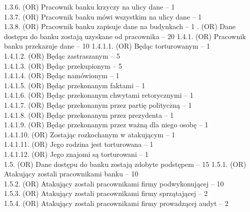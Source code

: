 \documentclass[10pt,a4paper,twoside]{article}
\newenvironment{subs}
{\adjustwidth{3em}{0pt}}
{\endadjustwidth}
\begin{document}
\begin{subs}
\begin{subs}
            1.3.6. (OR) Pracownik banku krzyczy na ulicy dane -- 1 \\
            1.3.7. (OR) Pracownik banku mówi wszystkim na ulicy dane -- 1 \\
            1.3.8. (OR) Pracownik banku zapisuje dane na budynkach -- 1
        \end{subs}
        1.4. (OR) Dane dostępu do banku zostają uzyskane od pracownika -- 20
        \begin{subs}
            1.4.1. (OR) Pracownik banku przekazuje dane -- 10
            \begin{subs}
                1.4.1.1. (OR) Będąc torturowanym -- 1 \\
                1.4.1.2. (OR) Będąc zastraszanym -- 5 \\
                1.4.1.3. (OR) Będąc przekupionym -- 5 \\
                1.4.1.4. (OR) Będąc namówionym -- 1 \\
                1.4.1.5. (OR) Będąc przekonanym faktami -- 1 \\
                1.4.1.6. (OR) Będąc przekonanym chwytami retorycznymi -- 1 \\
                1.4.1.7. (OR) Będąc przekonanym przez partię polityczną -- 1 \\
                1.4.1.8. (OR) Będąc przekonanym przez prezydenta -- 1 \\
                1.4.1.9. (OR) Będąc przekonanym przez ważną dla niego osobę -- 1 \\
                1.4.1.10. (OR) Zostając rozkochanym w atakującym -- 1 \\
                1.4.1.11. (OR) Jego rodzina jest torturowana -- 1 \\
                1.4.1.12. (OR) Jego znajomi są torturowani -- 1 \\
            \end{subs}
        \end{subs}
        1.5. (OR) Dane dostępu do banku zostają zdobyte podstępem -- 15
        \begin{subs}
            1.5.1. (OR) Atakujący zostali pracownikami banku -- 10 \\
            1.5.2. (OR) Atakujący zostali pracownikami firmy podwykonującej -- 10 \\
            1.5.3. (OR) Atakujący zostali pracownikami firmy sprzątającej -- 2 \\
            1.5.4. (OR) Atakujący zostali pracownikami firmy prowadzącej audyt -- 2 \\

\end{subs}
\end{subs}
\end{document}

